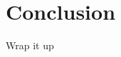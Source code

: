 \documentclass[twoside]{article}
\begin{document}
%
%
%
%
%
%
%
%
%
%
%
%
%



\section{Conclusion}

Wrap it up


\begin{thebibliography}{99} %
\end{thebibliography}


\end{document}
